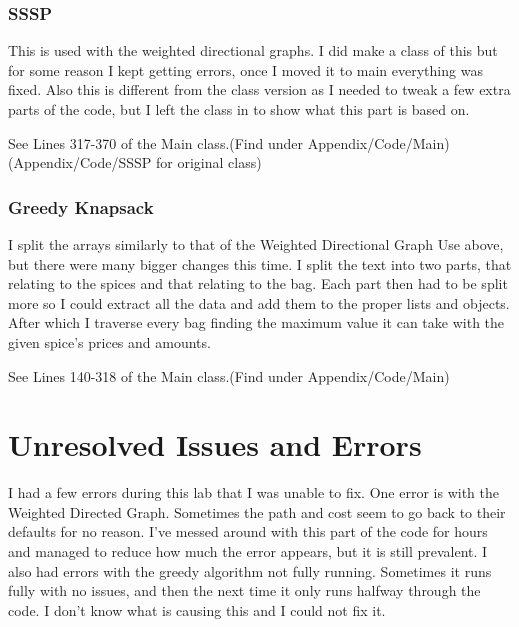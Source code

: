 \documentclass[10pt]{article}
\begin{document}
\subsubsection{SSSP}
This is used with the weighted directional graphs. I did make a class of this but for some reason I kept getting errors, once I moved it to main everything was fixed. Also this is different from the class version as I needed to tweak a few extra parts of the code, but I left the class in to show what this part is based on.

See Lines 317-370 of the Main class.(Find under Appendix/Code/Main)
(Appendix/Code/SSSP for original class)

\subsubsection{Greedy Knapsack}
I split the arrays similarly to that of the Weighted Directional Graph Use above, but there were many bigger changes this time. I split the text into two parts, that relating to the spices and that relating to the bag. Each part then had to be split more so I could extract all the data and add them to the proper lists and objects. After which I traverse every bag finding the maximum value it can take with the given spice's prices and amounts.


See Lines 140-318 of the Main class.(Find under Appendix/Code/Main)

\section{Unresolved Issues and Errors}
I had a few errors during this lab that I was unable to fix. One error is with the Weighted Directed Graph. Sometimes the path and cost seem to go back to their defaults for no reason. I've messed around with this part of the code for hours and managed to reduce how much the error appears, but it is still prevalent. I also had errors with the greedy algorithm not fully running. Sometimes it runs fully with no issues, and then the next time it only runs halfway through the code. I don't know what is causing this and I could not fix it.

\end{document}
